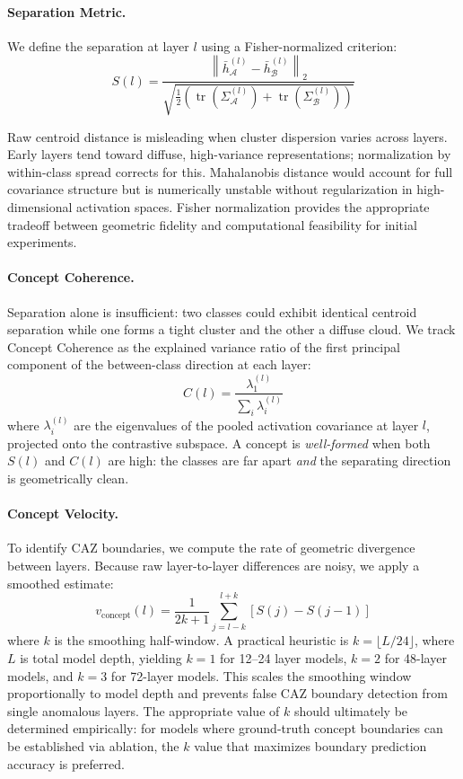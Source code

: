 \documentclass[11pt,a4paper]{article}
\begin{document}
\paragraph{Separation Metric.}
We define the separation at layer $l$ using a Fisher-normalized criterion:
\begin{equation}
	S(l) = \frac{\left\|\bar{h}_\mathcal{A}^{(l)} - \bar{h}_\mathcal{B}^{(l)}\right\|_2}
	{\sqrt{\frac{1}{2}\left(\operatorname{tr}(\Sigma_\mathcal{A}^{(l)}) +
			\operatorname{tr}(\Sigma_\mathcal{B}^{(l)})\right)}}
	\label{eq:separation}
\end{equation}

Raw centroid distance is misleading when cluster dispersion varies across layers.
Early layers tend toward diffuse, high-variance representations; normalization by
within-class spread corrects for this. Mahalanobis distance would account for full
covariance structure but is numerically unstable without regularization in
high-dimensional activation spaces. Fisher normalization provides the appropriate
tradeoff between geometric fidelity and computational feasibility for initial
experiments.

\paragraph{Concept Coherence.}
Separation alone is insufficient: two classes could exhibit identical centroid
separation while one forms a tight cluster and the other a diffuse cloud. We track
Concept Coherence as the explained variance ratio of the first principal component
of the between-class direction at each layer:
\begin{equation}
	C(l) = \frac{\lambda_1^{(l)}}{\sum_i \lambda_i^{(l)}}
	\label{eq:coherence}
\end{equation}
where $\lambda_i^{(l)}$ are the eigenvalues of the pooled activation covariance at
layer $l$, projected onto the contrastive subspace. A concept is \emph{well-formed}
when both $S(l)$ and $C(l)$ are high: the classes are far apart \emph{and} the
separating direction is geometrically clean.

\paragraph{Concept Velocity.}
To identify CAZ boundaries, we compute the rate of geometric divergence between layers.
Because raw layer-to-layer differences are noisy, we apply a smoothed estimate:
\begin{equation}
	v_\text{concept}(l) = \frac{1}{2k+1} \sum_{j=l-k}^{l+k} \left[S(j) - S(j-1)\right]
	\label{eq:velocity}
\end{equation}
where $k$ is the smoothing half-window. A practical heuristic is
$k = \lfloor L/24 \rfloor$, where $L$ is total model depth, yielding $k=1$ for
12--24 layer models, $k=2$ for 48-layer models, and $k=3$ for 72-layer models.
This scales the smoothing window proportionally to model depth and prevents false
CAZ boundary detection from single anomalous layers. The appropriate value of $k$
should ultimately be determined empirically: for models where ground-truth concept
boundaries can be established via ablation, the $k$ value that maximizes boundary
prediction accuracy is preferred.
\end{document}
